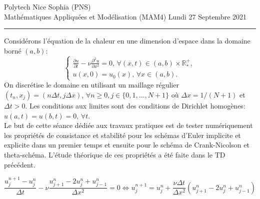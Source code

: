 \documentclass[12pt,a4paper]{article}
\begin{document}
 \hfill Polytech Nice Sophia (PNS)\\
\noindent Math\'ematiques Appliqu\'ees et Mod\'elisation (MAM4) \hfill Lundi 27 Septembre 2021 \\

\hrule

%
%
\medskip

\noindent Consid\'erons l'\'equation de la chaleur en une dimension d'espace dans la domaine born\'e $(a,b)$:
$$
\begin{cases}
\displaystyle\frac{\partial u}{\partial t}-\nu \frac{\partial^2 u}{\partial x^2}=0,\, \forall (x,t)\in(a,b)\times\mathbb{R}^+_*,\\[2ex]
u(x,0)=u_0(x),\,\forall x\in (a,b).
\end{cases}
$$
On discr\'etise le domaine en utilisant un maillage r\'egulier
$(t_n,x_j)=(n\Delta t,j\Delta x)$,  $\forall n\ge 0,
j\in\{0,1,...,N+1\}$ o\`u $\Delta x=1/(N+1)$ et $\Delta t>0$.  Les conditions aux limites sont des conditions de Dirichlet homogènes:
$u(a,t)=u(b,t)=0,\,\forall t$. \\

\noindent Le but de cette séance dédiée aux travaux pratiques est de tester numériquement les propriétés de consistance et stabilité pour les schémas d'Euler implicite et explicite dans un premier temps et ensuite pour le schéma de Crank-Nicolson et theta-schéma. L'étude théorique de ces propriétés a été faite dans le TD précédent. \\



$$
\frac{u_j^{n+1}-u_j^n}{\Delta t}-\nu \frac{u_{j+1}^{n}-2u_j^n+u_{j-1}^{n}}{\Delta x^2}=0 \Leftrightarrow u_j^{n+1} = u_j^n + \frac{\nu\Delta t}{\Delta x^2}(u_{j+1}^{n}-2u_j^n+u_{j-1}^{n})
$$
\end{document}
